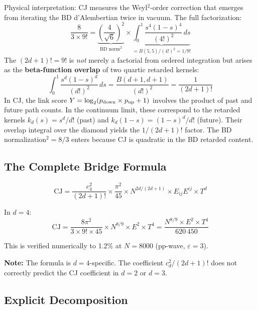 \documentclass[11pt,a4paper]{article}
\begin{document}
Physical interpretation: CJ measures the Weyl$^2$-order correction that emerges from iterating the BD d'Alembertian twice in vacuum. The full factorization:
\begin{equation}
\frac{8}{3 \times 9!} = \underbrace{\left(\frac{4}{\sqrt{6}}\right)^2}_{\text{BD norm}^2} \times \underbrace{\int_0^1 \frac{s^4(1-s)^4}{(4!)^2}\,ds}_{= B(5,5)/(4!)^2 = 1/9!}
\end{equation}
The $(2d+1)! = 9!$ is \emph{not} merely a factorial from ordered integration but arises as the \textbf{beta-function overlap} of two quartic retarded kernels:
\begin{equation}
\int_0^1 \frac{s^d(1-s)^d}{(d!)^2}\,ds = \frac{B(d{+}1,d{+}1)}{(d!)^2} = \frac{1}{(2d{+}1)!}
\end{equation}
In CJ, the link score $Y = \log_2(p_{\rm down} \times p_{\rm up} + 1)$ involves the product of past and future path counts. In the continuum limit, these correspond to the retarded kernels $k_d(s) = s^d/d!$ (past) and $k_d(1{-}s) = (1{-}s)^d/d!$ (future). Their overlap integral over the diamond yields the $1/(2d{+}1)!$ factor. The BD normalization$^2 = 8/3$ enters because CJ is quadratic in the BD retarded content.

\subsection{The Complete Bridge Formula}

\begin{equation}
\boxed{\text{CJ} = \frac{c_4^2}{(2d+1)!} \times \frac{\pi^2}{45} \times N^{2d/(2d+1)} \times E_{ij}E^{ij} \times T^d}
\end{equation}

In $d=4$:
\begin{equation}
\text{CJ} = \frac{8\pi^2}{3 \times 9! \times 45} \times N^{8/9} \times E^2 \times T^4 = \frac{N^{8/9} \times E^2 \times T^4}{620\,450}
\end{equation}

This is verified numerically to 1.2\% at $N = 8000$ (pp-wave, $\varepsilon = 3$).

\textbf{Note:} The formula is $d=4$-specific. The coefficient $c_d^2/(2d+1)!$ does not correctly predict the CJ coefficient in $d=2$ or $d=3$.

\subsection{Explicit Decomposition}
\end{document}
